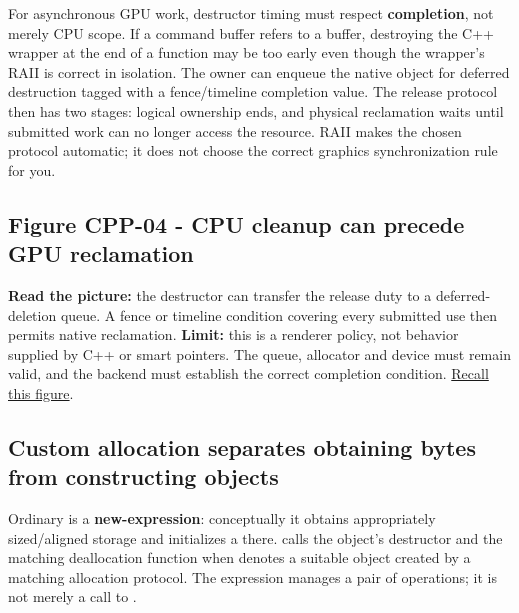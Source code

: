 For asynchronous GPU work, destructor timing must respect \textbf{completion}, not merely CPU scope. If a command buffer refers to a buffer, destroying the C++ wrapper at the end of a function may be too early even though the wrapper's RAII is correct in isolation. The owner can enqueue the native object for deferred destruction tagged with a fence/timeline completion value. The release protocol then has two stages: logical ownership ends, and physical reclamation waits until submitted work can no longer access the resource. RAII makes the chosen protocol automatic; it does not choose the correct graphics synchronization rule for you.

\subsection{Figure CPP-04 - CPU cleanup can precede GPU reclamation}\label{01-foundations-i-ch004-figure-cpp-04---cpu-cleanup-can-precede-gpu-reclamation}

\hypertarget{01-foundations-i-ch004-figure-cpp-04---cpu-cleanup-can-precede-gpu-reclamation}{}


\textbf{Read the picture:} the destructor can transfer the release duty to a deferred-deletion queue. A fence or timeline condition covering every submitted use then permits native reclamation. \textbf{Limit:} this is a renderer policy, not behavior supplied by C++ or smart pointers. The queue, allocator and device must remain valid, and the backend must establish the correct completion condition. \hyperref[appendix-960160274237-four-figure-briefs]{Recall this figure}.

\subsection{Custom allocation separates obtaining bytes from constructing objects}\label{01-foundations-i-ch004-custom-allocation-separates-obtaining-bytes-from-constructing-objects}

\hypertarget{01-foundations-i-ch004-custom-allocation-separates-obtaining-bytes-from-constructing-objects}{}

Ordinary  is a \textbf{new-expression}: conceptually it obtains appropriately sized/aligned storage and initializes a  there.  calls the object's destructor and the matching deallocation function when  denotes a suitable object created by a matching allocation protocol. The expression manages a pair of operations; it is not merely a call to .

